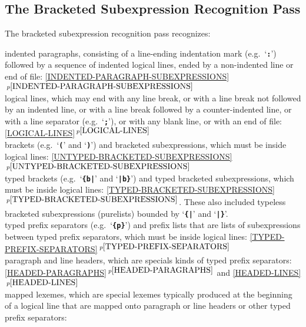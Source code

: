 \documentclass[12pt]{article}
\newcommand{\TT}[1]{{\tt \bfseries #1}}
\newcommand{\itemref}[1]{\ref{#1}$\,^{p\pageref{#1}}$}
\newenvironment{indpar}[1][0.3in]%
	{\begin{list}{}%
		     {\setlength{\itemsep}{0in}%
		      \setlength{\topsep}{0in}%
		      \setlength{\parsep}{1ex}%
		      \setlength{\labelwidth}{#1}%
		      \setlength{\leftmargin}{#1}%
		      \addtolength{\leftmargin}{\labelsep}}%
	 \item}%
	{\end{list}}
\begin{document}
\subsection{The Bracketed Subexpression Recognition Pass}
\label{BRACKETED-SUBEXPRESSION-RECOGNITION-PASS}

The bracketed subexpression recognition pass recognizes:
\begin{indpar}[0.5in]
\hspace*{-0.2in}indented paragraphs, consisting of a line-ending
    indentation mark (e.g.~`\TT{:}') followed by a sequence of
    indented logical lines, ended by a non-indented line or end
    of file: \itemref{INDENTED-PARAGRAPH-SUBEXPRESSIONS}
\\[0.5ex]
\hspace*{-0.2in}logical lines, which may end with any line break,
    or with a line break not followed by an indented line,
    or with a line break followed by a counter-indented line,
    or with a line separator (e.g.~`\TT{;}'),
    or with any blank line, or with an end of file:
    \itemref{LOGICAL-LINES}
\\[0.5ex]
\hspace*{-0.2in}brackets (e.g.~`\TT{(}' and `\TT{)}')
    and bracketed subexpressions, which must be inside logical lines:
    \itemref{UNTYPED-BRACKETED-SUBEXPRESSIONS}
\\[0.5ex]
\hspace*{-0.2in}typed brackets (e.g.~`\TT{\{b|}' and `\TT{|b\}}')
    and typed bracketed subexpressions, which must be inside logical lines:
    \itemref{TYPED-BRACKETED-SUBEXPRESSIONS}.  These also included typeless
    bracketed subexpressions (purelists) bounded by
    `\TT{\{|}' and `\TT{|\}}'.
\\[0.5ex]
\hspace*{-0.2in}typed prefix separators (e.g.~`\TT{\{p\}}')
    and prefix lists that are lists of subexpressions between
    typed prefix separators, which must be inside logical lines:
    \itemref{TYPED-PREFIX-SEPARATORS}
\\[0.5ex]
\hspace*{-0.2in}paragraph and line headers, which are specials kinds of
    typed prefix separators:
    \itemref{HEADED-PARAGRAPHS} and \itemref{HEADED-LINES}
\\[0.5ex]
\hspace*{-0.2in}mapped lexemes, which are special lexemes typically
    produced at the beginning of a logical line that are mapped onto
    paragraph or line headers or other typed prefix separators:

\end{indpar}
\end{document}
